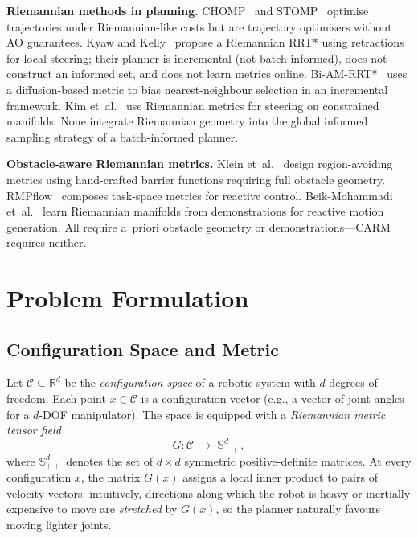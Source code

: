 \documentclass[journal]{IEEEtran}
\newcommand{\Cspace}{\mathcal{C}}
\begin{document}
\textbf{Riemannian methods in planning.}
CHOMP~\cite{Ratliff2009} and STOMP~\cite{Zucker2013} optimise
trajectories under Riemannian-like costs but are trajectory
optimisers without AO guarantees.
Kyaw and Kelly~\cite{Kyaw2026} propose a Riemannian RRT* using
retractions for local steering; their planner is incremental
(not batch-informed), does not construct an informed set, and does
not learn metrics online.
Bi-AM-RRT*~\cite{Zhang2023biamrrt} uses a diffusion-based metric to
bias nearest-neighbour selection in an incremental framework.
Kim et~al.~\cite{Kim2016} use Riemannian metrics for steering on
constrained manifolds.
None integrate Riemannian geometry into the global informed sampling
strategy of a batch-informed planner.

\textbf{Obstacle-aware Riemannian metrics.}
Klein et~al.~\cite{Klein2023} design region-avoiding metrics using
hand-crafted barrier functions requiring full obstacle geometry.
RMPflow~\cite{Cheng2018rmpflow} composes task-space metrics for
reactive control.
Beik-Mohammadi et~al.~\cite{BeikMohammadi2023} learn Riemannian
manifolds from demonstrations for reactive motion generation.
All require a~priori obstacle geometry or demonstrations---CARM
requires neither.


\section{Problem Formulation}\label{sec:problem}

\subsection*{Configuration Space and Metric}

Let $\Cspace \subseteq \mathbb{R}^d$ be the \emph{configuration space} of a
robotic system with $d$ degrees of freedom.
Each point $x \in \Cspace$ is a configuration vector
(e.g., a vector of joint angles for a $d$-DOF manipulator).
The space is equipped with a \emph{Riemannian metric tensor field}
\[
  G : \Cspace \;\longrightarrow\; \mathbb{S}^d_{++},
\]
where $\mathbb{S}^d_{++}$ denotes the set of $d \!\times\! d$ symmetric
positive-definite matrices.
At every configuration $x$, the matrix $G(x)$ assigns a local inner product
to pairs of velocity vectors: intuitively, directions along which the robot
is heavy or inertially expensive to move are \emph{stretched} by $G(x)$,
so the planner naturally favours moving lighter joints.
\end{document}
